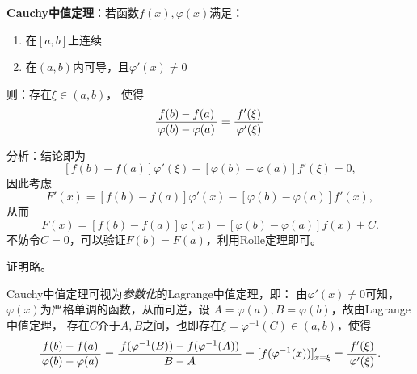\begin{thx}
	{\bf Cauchy中值定理}：若函数$f(x),\varphi(x)$满足： 
	\begin{enumerate}[(1)]
	  \item 在$[a,b]$上连续 
	  \item 在$(a,b)$内可导，且$\varphi'(x)\ne 0$ 
	\end{enumerate}
	则：存在$\xi\in(a,b)$， 使得
	$$\displaystyle\frac{\,{f(b)-f(a)}\,}{\,{\varphi(b)-\varphi(a)}\,}=\displaystyle\frac{\,{f'(\xi)}\,}{\,{\varphi'(\xi)}\,}$$
\end{thx}

分析：结论即为
$$[f(b)-f(a)]\varphi'(\xi)-[\varphi(b)-\varphi(a)]f'(\xi)=0,$$
因此考虑
$$F'(x)=[f(b)-f(a)]\varphi'(x)-[\varphi(b)-\varphi(a)]f'(x),$$
从而
$$F(x)=[f(b)-f(a)]\varphi(x)-[\varphi(b)-\varphi(a)]f(x)+C.$$
不妨令$C=0$，可以验证$F(b)=F(a)$，利用Rolle定理即可。

证明略。

\bs
Cauchy中值定理可视为{\it 参数化}的Lagrange中值定理，即：
由$\varphi'(x)\ne 0$可知，$\varphi(x)$为严格单调的函数，从而可逆，设
$A=\varphi(a),B=\varphi(b)$，故由Lagrange中值定理，
存在$C$介于$A,B$之间，也即存在$\xi=\varphi^{-1}(C)\in(a,b)$，使得
$$\displaystyle\frac{\,{f(b)-f(a)}\,}{\,{\varphi(b)-\varphi(a)}\,}
=\displaystyle\frac{\,{f(\varphi^{-1}(B))-f(\varphi^{-1}(A))}\,}{\,{B-A}\,}
=[f(\varphi^{-1}(x))]'_{x=\xi}=\displaystyle\frac{\,{f'(\xi)}\,}{\,{\varphi'(\xi)}\,}.$$

